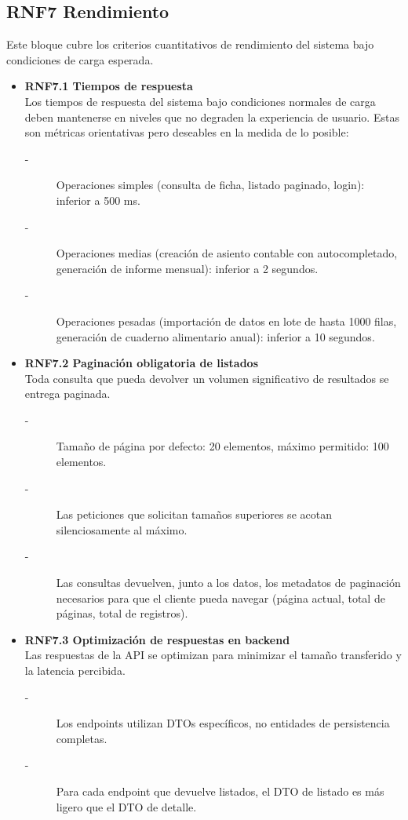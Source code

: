\subsection{RNF7 Rendimiento}
Este bloque cubre los criterios cuantitativos de rendimiento del
sistema bajo condiciones de carga esperada.
\begin{itemize}
    \item \textbf{RNF7.1 Tiempos de respuesta} \\
    Los tiempos de respuesta del sistema bajo condiciones normales de
    carga deben mantenerse en niveles que no degraden la experiencia
    de usuario. Estas son métricas orientativas pero deseables en la medida de lo posible:
    \begin{description}
        \item[-] Operaciones simples (consulta de ficha, listado paginado, login): inferior a 500 ms.
        \item[-] Operaciones medias (creación de asiento contable con autocompletado, generación de 
        informe mensual): inferior a 2 segundos.
        \item[-] Operaciones pesadas (importación de datos en lote de hasta 1000
        filas, generación de cuaderno alimentario anual): inferior a 10 segundos. 
    \end{description}


    \item \textbf{RNF7.2 Paginación obligatoria de listados} \\
    Toda consulta que pueda devolver un volumen significativo de
    resultados se entrega paginada.
    \begin{description}
        \item[-] Tamaño de página por defecto: 20 elementos, máximo permitido: 100 elementos. 
        \item[-] Las peticiones que solicitan tamaños superiores se acotan
        silenciosamente al máximo. 
        \item[-] Las consultas devuelven, junto a los datos, los metadatos de
        paginación necesarios para que el cliente pueda navegar
        (página actual, total de páginas, total de registros).
    \end{description}


    \item \textbf{RNF7.3 Optimización de respuestas en backend} \\
    Las respuestas de la API se optimizan para minimizar el tamaño
    transferido y la latencia percibida.
    \begin{description}
        \item[-] Los endpoints utilizan DTOs específicos, no entidades de
        persistencia completas.
        \item[-] Para cada endpoint que devuelve listados, el DTO de listado es
        más ligero que el DTO de detalle. 
    \end{description}



\end{itemize}
